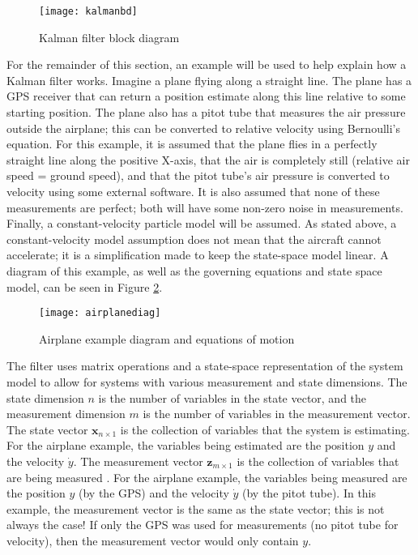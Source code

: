 \documentclass[11pt]{ucthesisCP}
\begin{document}
\begin{figure}[htbp]
	\centering
	\texttt{[image: kalmanbd]}
	\caption{Kalman filter block diagram \cite{kfsimply}}
	\label{fig:kalmanbd}
\end{figure}

For the remainder of this section, an example will be used to help explain how a Kalman filter works. Imagine a plane flying along a straight line. The plane has a GPS receiver that can return a position estimate along this line relative to some starting position. The plane also has a pitot tube that measures the air pressure outside the airplane; this can be converted to relative velocity using Bernoulli’s equation. For this example, it is assumed that the plane flies in a perfectly straight line along the positive X-axis, that the air is completely still (relative air speed = ground speed), and that the pitot tube’s air pressure is converted to velocity using some external software. It is also assumed that none of these measurements are perfect; both will have some non-zero noise in measurements. Finally, a constant-velocity particle model will be assumed. As stated above, a constant-velocity model assumption does not mean that the aircraft cannot accelerate; it is a simplification made to keep the state-space model linear. A diagram of this example, as well as the governing equations and state space model, can be seen in Figure \ref{fig:airplanediag}.

\begin{figure}[htbp]
	\centering
	\texttt{[image: airplanediag]}
	\caption{Airplane example diagram and equations of motion}
	\label{fig:airplanediag}
\end{figure}

The filter uses matrix operations and a state-space representation of the system model to allow for systems with various measurement and state dimensions. The state dimension \(n\) is the number of variables in the state vector, and the measurement dimension \(m\) is the number of variables in the measurement vector. The state vector \(\mathbf{x}_{n \times 1}\) is the collection of variables that the system is estimating. For the airplane example, the variables being estimated are the position \(y\) and the velocity \(\dot{y}\). The measurement vector \(\mathbf{z}_{m \times 1}\) is the collection of variables that are being measured \cite{kfsimply}. For the airplane example, the variables being measured are the position \(y\) (by the GPS) and the velocity \(\dot{y}\) (by the pitot tube). In this example, the measurement vector is the same as the state vector; this is not always the case! If only the GPS was used for measurements (no pitot tube for velocity), then the measurement vector would only contain \(y\).
\end{document}
